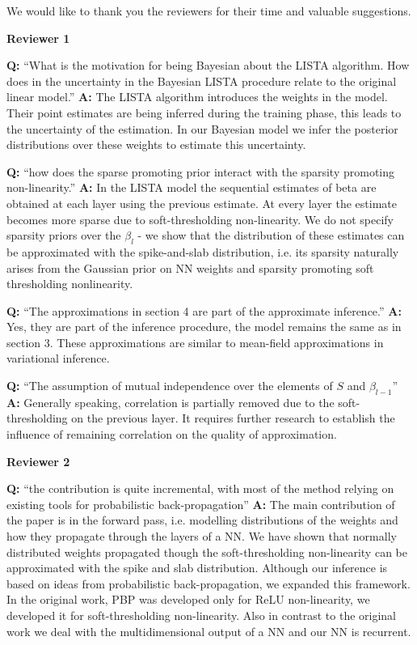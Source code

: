 \documentclass{article}
\begin{document}
We would like to thank you the reviewers for their time and valuable suggestions.

\textbf{Reviewer 1}

\textbf{Q:} ``What is the motivation for being Bayesian about the LISTA algorithm. How does in the uncertainty in the Bayesian LISTA procedure relate to the original linear model.'' 
\textbf{A:} The LISTA algorithm introduces the weights in the model. Their point estimates are being inferred during the training phase, this leads to the uncertainty of the estimation. In our Bayesian model we infer the posterior distributions over these weights to estimate this uncertainty.

\textbf{Q:} ``how does the sparse promoting prior interact with the sparsity promoting non-linearity.'' 
\textbf{A:} In the LISTA model the sequential estimates of beta are obtained at each layer using the previous estimate. At every layer the estimate becomes more sparse due to soft-thresholding non-linearity. We do not specify sparsity priors over the $\beta_l$ - we show that the distribution of these estimates can be approximated with the spike-and-slab distribution, i.e. its sparsity naturally arises from the Gaussian prior on NN weights and sparsity promoting soft thresholding nonlinearity.

\textbf{Q:} ``The approximations in section 4 are part of the approximate inference.''  
\textbf{A:} Yes, they are part of the inference procedure, the model remains the same as in section 3. These approximations are similar to mean-field approximations in variational inference.

\textbf{Q:} ``The assumption of mutual independence over the elements of $S$ and $\beta_{l-1}$'' 
\textbf{A:} Generally speaking, correlation is partially removed due to the soft-thresholding on the previous layer. It requires further research to establish the influence of remaining correlation on the quality of approximation.

\textbf{Reviewer 2}

\textbf{Q:} ``the contribution is quite incremental, with most of the method relying on existing tools for probabilistic back-propagation'' 
\textbf{A:} The main contribution of the paper is in the forward pass, i.e. modelling distributions of the weights and how they propagate through the layers of a NN. We have shown that normally distributed weights propagated though the soft-thresholding non-linearity can be approximated with the spike and slab distribution. Although our inference is based on ideas from probabilistic back-propagation, we expanded this framework. In the original work, PBP was developed only for ReLU non-linearity, we developed it for soft-thresholding non-linearity. Also in contrast to the original work we deal with the multidimensional output of a NN and our NN is recurrent. 
\end{document}
